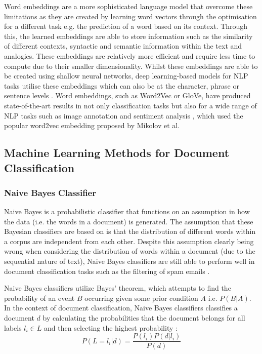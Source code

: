 \documentclass[a4paper,twoside,phd]{BYUPhys}
\begin{document}
Word embeddings are a more sophisticated language model that overcome these limitations as they are created by learning word vectors through the optimisation for a different task e.g. the prediction of a word based on its context. Through this, the learned embeddings are able to store information such as the similarity of different contexts, syntactic and semantic information within the text and analogies. These embeddings are relatively more efficient and require less time to compute due to their smaller dimensionality. Whilst these embeddings are able to be created using shallow neural networks, deep learning-based models for NLP tasks utilise these embeddings which can also be at the character, phrase or sentence levels \cite{Young}. Word embeddings, such as Word2Vec or GloVe, have produced state-of-the-art results in not only classification tasks \cite{Howard2018} but also for a wide range of NLP tasks such as image annotation \cite{Weston} and sentiment analysis \cite{Cambria2017}, which used the popular word2vec embedding proposed by Mikolov et al. \cite{Mikolov}


\subsection{Machine Learning Methods for Document Classification}
\label{MLDocumentClassificaiton}

\subsubsection{Naive Bayes Classifier}
\label{sec:NaiveBayes}

Naive Bayes is a probabilistic classifier that functions on an assumption in how the data (i.e. the words in a document) is generated. The assumption that these Bayesian classifiers are based on is that the distribution of different words within a corpus are independent from each other. Despite this assumption clearly being wrong when considering the distribution of words within a document (due to the sequential nature of text), Naive Bayes classifiers are still able to perform well in document classification tasks such as the filtering of spam emails \cite{Sahami}.

Naive Bayes classifiers utilize Bayes' theorem, which attempts to find the probability of an event $B$ occurring given some prior condition $A$ i.e. $P(B| A)$. In the context of document classification, Naive Bayes classifiers classifies a document $d$ by calculating the probabilities that the document belongs for all labels $l_i \in L$ and then selecting the highest probability \cite{Allahyari2017}:
\begin{equation}
P(L = l_i| d) = \frac{P(l_i)P(d| l_i)}{P(d)}
\end{equation}
\end{document}
